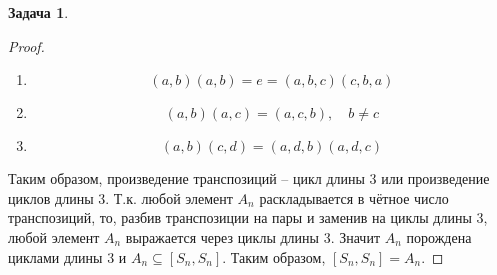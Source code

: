 \documentclass[12pt]{article}
\theoremstyle{definition}
\newtheorem{zad}{Задача}[section]
\begin{document}
\begin{zad}
\begin{itemize}
\begin{proof}
        \begin{enumerate}
            \item \begin{equation}
                (a,b)(a,b)=e=(a,b,c)(c,b,a)
            \end{equation}
            \item \begin{equation}
                (a,b)(a,c)=(a,c,b),\quad b\neq c
            \end{equation}
            \item \begin{equation}
                (a,b)(c,d)=(a,d,b)(a,d,c)
            \end{equation}
        \end{enumerate}
        Таким образом, произведение транспозиций -- цикл длины 3 или произведение циклов длины 3. Т.к. любой элемент $A_n$ раскладывается в чётное число транспозиций, то, разбив транспозиции на пары и заменив на циклы длины 3, любой элемент $A_n$ выражается через циклы длины 3. Значит $A_n$ порождена циклами длины 3 и $A_n\subseteq [S_n,S_n]$. Таким образом, $[S_n,S_n]= A_n$.
    \end{proof}
\end{itemize}
\end{zad}
\end{document}
